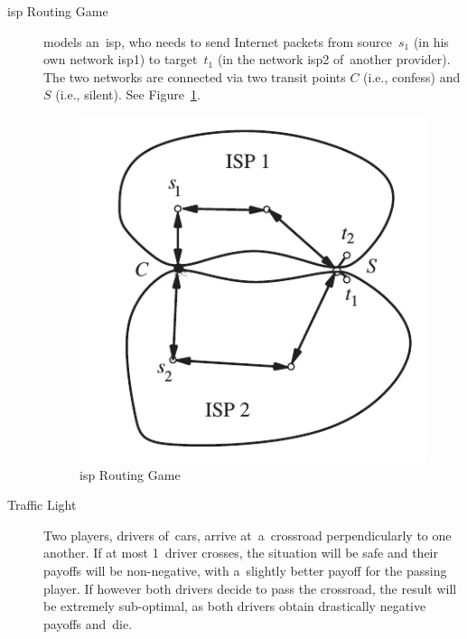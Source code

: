 \begin{description}
  \item [\acrshort{isp} Routing Game] models an~\acrfull{isp}, who needs to send Internet packets from source~$s_1$ (in his own network \acrshort{isp}1) to target~$t_1$ (in the network \acrshort{isp}2 of~another provider).
    The two networks are connected via two transit points $C$ (i.e., confess) and $S$ (i.e., silent).
    See Figure~\ref{fig:isp-routing}.
    \begin{figure}[H]
      \centering
      \includegraphics[width=.25\paperwidth]{../img/isp.png}
      \caption{\acrshort{isp} Routing Game}
      \label{fig:isp-routing}
    \end{figure}

  \item [Traffic Light]
    Two players, drivers of~cars, arrive at~a~crossroad perpendicularly to one another.
    If at most 1~driver crosses, the situation will be safe and their payoffs will be non-negative, with a~slightly better payoff for the passing player.
    If however both drivers decide to pass the crossroad, the result will be extremely sub-optimal, as both drivers obtain drastically negative payoffs and~die.


\end{description}
